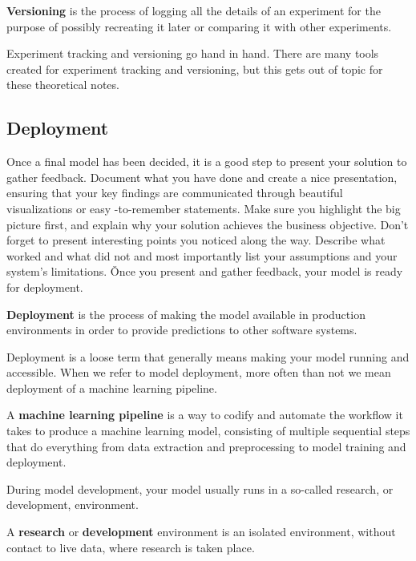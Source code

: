 \bd[Versioning]
\textbf{Versioning} is the process of logging all the details of an experiment for the purpose of possibly recreating it
later or comparing it with other experiments.
\ed

Experiment tracking and versioning go hand in hand. There are many tools created for experiment tracking and versioning,
but this gets out of topic for these theoretical notes.

\subsection{Deployment}

Once a final model has been decided, it is a good step to present your solution to gather feedback. Document what you
have done and create a nice presentation, ensuring that your key findings are communicated through beautiful
visualizations or easy -to-remember statements. Make sure you highlight the big picture first, and explain why your
solution achieves the business objective. Don't forget to present interesting points you noticed along the way.
Describe what worked and what did not and most importantly list your assumptions and your system's limitations. \v

Once you present and gather feedback, your model is ready for deployment.

\bd[Deployment]
\textbf{Deployment} is the process of making the model available in production environments in order to provide
predictions to other software systems.
\ed

Deployment is a loose term that generally means making your model running and accessible. When we refer to model
deployment, more often than not we mean deployment of a machine learning pipeline.

A \textbf{machine learning pipeline} is a way to codify and automate the workflow it takes to produce a machine learning
model, consisting of multiple sequential steps that do everything from data extraction and preprocessing to model
training and deployment.
\ed

During model development, your model usually runs in a so-called research, or development, environment.

A \textbf{research} or \textbf{development} environment is an isolated environment, without contact to live data, where
research is taken place.
\ed

